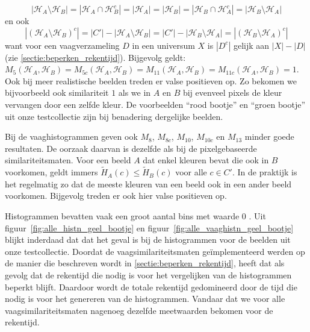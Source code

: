 \begin{displaymath}
|\mathcal{H}_A \setminus \mathcal{H}_B|=|\mathcal{H}_A \cap \mathcal{H}_{B}^c|=|\mathcal{H}_A|=|\mathcal{H}_B|=|\mathcal{H}_B \cap \mathcal{H}_{A}^c|=|\mathcal{H}_B \setminus \mathcal{H}_A|
\end{displaymath}
en ook
\begin{displaymath}
|(\mathcal{H}_A  \setminus \mathcal{H}_B)^c|=|C'|-|\mathcal{H}_A \setminus \mathcal{H}_B|=|C'|-|\mathcal{H}_B \setminus \mathcal{H}_A|=|(\mathcal{H}_B  \setminus \mathcal{H}_A)^c|
\end{displaymath}
want voor een vaagverzameling $D$ in een universum $X$ is $|D^c|$ gelijk aan $|X|-|D|$ (zie \ref{sectie:beperken_rekentijd}). Bijgevolg geldt:
$M_5(\mathcal{H}_A,\mathcal{H}_B)=M_{5c}(\mathcal{H}_A,\mathcal{H}_B)=M_{11}(\mathcal{H}_A,\mathcal{H}_B)=M_{11c}(\mathcal{H}_A,\mathcal{H}_B)=1$.
Ook bij meer realistische beelden treden er valse positieven op. Zo bekomen 
we bijvoorbeeld ook similariteit $1$ als we in $A$ en $B$ bij evenveel pixels de kleur vervangen door 
een zelfde kleur. De voorbeelden ``rood bootje'' en ``groen bootje'' uit onze testcollectie zijn bij 
benadering dergelijke beelden. 

Bij de vaaghistogrammen geven ook $M_8$, $M_{8c}$, $M_{10}$, $M_{10c}$ en $M_{13}$ minder goede resultaten.
De oorzaak daarvan is dezelfde als bij de pixelgebaseerde similariteitsmaten. Voor een beeld $A$ dat enkel
kleuren bevat die ook in $B$ voorkomen, geldt immers $\widetilde{H}_A(c) \leq \widetilde{H}_B(c)$ voor 
alle $c \in C'$. In de praktijk is het regelmatig zo dat de meeste kleuren van een beeld ook in een
ander beeld voorkomen. Bijgevolg treden er ook hier valse positieven op.

Histogrammen bevatten vaak een groot aantal bins met waarde $0$ \cite{berens:compressed_colour_histograms}. Uit 
figuur~\ref{fig:alle_histn_geel_bootje} en figuur~\ref{fig:alle_vaaghistn_geel_bootje} blijkt 
inderdaad dat dat het geval is bij de histogrammen voor de beelden uit onze testcollectie. 
Doordat de vaagsimilariteitsmaten ge\"implementeerd werden op de manier die beschreven wordt in 
\ref{sectie:beperken_rekentijd}, heeft dat als gevolg dat de rekentijd die nodig is voor het 
vergelijken van de histogrammen beperkt blijft. Daardoor wordt de totale rekentijd gedomineerd door 
de tijd die nodig is voor het genereren van de histogrammen. Vandaar dat we voor alle 
vaagsimilariteitsmaten nagenoeg dezelfde meetwaarden bekomen voor de rekentijd. 


